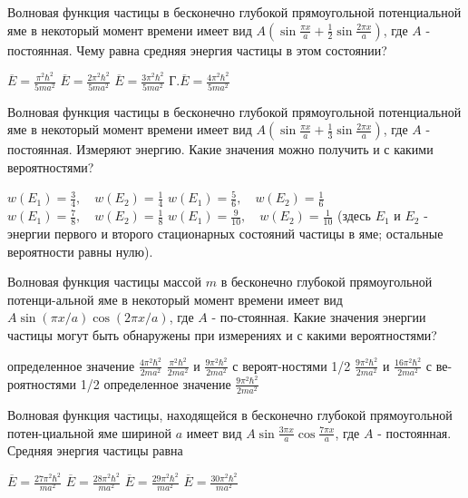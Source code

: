 \documentclass[11pt,a4paper]{exam}
\begin{document}
\begin{questions}
\question Волновая функция частицы в бесконечно глубокой прямоугольной потенциальной яме в некоторый момент времени имеет вид $A\left( {\sin \frac{{\pi x}}{a} + \frac{1}{2}\sin \frac{{2\pi x}}{a}} \right)$, где $A$ - постоянная. Чему равна средняя энергия частицы в этом состоянии?
\begin{choices}
\choice $\overline E  = \frac{{{\pi ^2}{\hbar ^2}}}{{5m{a^2}}}$     
\choice $\overline E  = \frac{{2{\pi ^2}{\hbar ^2}}}{{5m{a^2}}}$    
\choice $\overline E  = \frac{{3{\pi ^2}{\hbar ^2}}}{{5m{a^2}}}$    Г.$\overline E  = \frac{{4{\pi ^2}{\hbar ^2}}}{{5m{a^2}}}$
\end{choices}

\question Волновая функция частицы в бесконечно глубокой прямоугольной потенциальной яме в некоторый момент времени имеет вид $A\left( {\sin \frac{{\pi x}}{a} + \frac{1}{3}\sin \frac{{2\pi x}}{a}} \right)$, где $A$ - постоянная. Измеряют энергию. Какие значения можно получить и с какими вероятностями? 
\begin{choices}
\choice $w\left( {{E_1}} \right) = \frac{3}{4},\quad w\left( {{E_2}} \right) = \frac{1}{4}$    
\choice $w\left( {{E_1}} \right) = \frac{5}{6},\quad w\left( {{E_2}} \right) = \frac{1}{6}$
\choice $w\left( {{E_1}} \right) = \frac{7}{8},\quad w\left( {{E_2}} \right) = \frac{1}{8}$    
\choice $w\left( {{E_1}} \right) = \frac{9}{{10}},\quad w\left( {{E_2}} \right) = \frac{1}{{10}}$
(здесь ${E_1}$ и ${E_2}$ - энергии первого и второго стационарных состояний частицы в яме; остальные вероятности равны нулю).
\end{choices}

\question Волновая функция частицы массой $m$ в бесконечно глубокой прямоугольной потенци-альной яме в некоторый момент времени имеет вид $A\sin (\pi x/a)\cos (2\pi x/a)$, где $A$ - по-стоянная. Какие значения энергии частицы могут быть обнаружены при измерениях и с какими вероятностями?
\begin{choices}
\choice определенное значение $\frac{{4{\pi ^2}{\hbar ^2}}}{{2m{a^2}}}$         
\choice $\frac{{{\pi ^2}{\hbar ^2}}}{{2m{a^2}}}$ и $\frac{{9{\pi ^2}{\hbar ^2}}}{{2m{a^2}}}$ с вероят-ностями 1/2
\choice $\frac{{9{\pi ^2}{\hbar ^2}}}{{2m{a^2}}}$ и $\frac{{16{\pi ^2}{\hbar ^2}}}{{2m{a^2}}}$ с ве-роятностями 1/2      
\choice определенное значение $\frac{{9{\pi ^2}{\hbar ^2}}}{{2m{a^2}}}$
\end{choices}

\question Волновая функция частицы, находящейся в бесконечно глубокой прямоугольной потен-циальной яме шириной $a$ имеет вид $A\sin \frac{{3\pi x}}{a}\cos \frac{{7\pi x}}{a}$, где $A$ - постоянная. Средняя энергия частицы равна
\begin{choices}
\choice $\overline E  = \frac{{27{\pi ^2}{\hbar ^2}}}{{m{a^2}}}$ 
\choice $\overline E  = \frac{{28{\pi ^2}{\hbar ^2}}}{{m{a^2}}}$ 
\choice $\overline E  = \frac{{29{\pi ^2}{\hbar ^2}}}{{m{a^2}}}$ 
\choice $\overline E  = \frac{{30{\pi ^2}{\hbar ^2}}}{{m{a^2}}}$
\end{choices}


\end{questions}
\end{document}
